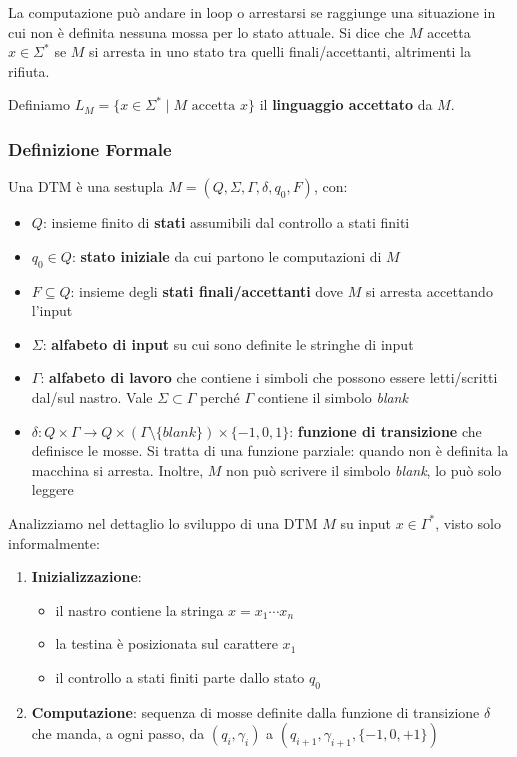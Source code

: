 La computazione può andare in loop o arrestarsi se raggiunge una situazione in cui non è definita nessuna mossa per lo stato attuale. Si dice che $M$ accetta $x \in \Sigma^\ast$ se $M$ si arresta in uno stato tra quelli finali/accettanti, altrimenti la rifiuta.

Definiamo $L_M = \{x \in \Sigma^\ast \mid M \text{ accetta } x \}$ il \textbf{linguaggio accettato} da $M$.

\subsubsection{Definizione Formale}
Una DTM è una sestupla $M = \left(Q, \Sigma, \Gamma, \delta, q_0, F\right)$, con:
\begin{itemize}
	\item $Q$: insieme finito di \textbf{stati} assumibili dal controllo a stati finiti
	\item $q_0 \in Q$: \textbf{stato iniziale} da cui partono le computazioni di $M$
	\item $F \subseteq Q$: insieme degli \textbf{stati finali/accettanti} dove $M$ si arresta accettando l'input
	\item $\Sigma$: \textbf{alfabeto di input} su cui sono definite le stringhe di input
	\item $\Gamma$: \textbf{alfabeto di lavoro} che contiene i simboli che possono essere letti/scritti dal/sul nastro. Vale $\Sigma \subset \Gamma$ perché $\Gamma$ contiene il simbolo \textit{blank}
	\item $\delta: Q \times \Gamma \rightarrow Q \times (\Gamma \setminus \{blank\}) \times \{-1, 0, 1\}$: \textbf{funzione di transizione} che definisce le mosse. Si tratta di una funzione parziale: quando non è definita la macchina si arresta. Inoltre, $M$ non può scrivere il simbolo \textit{blank}, lo può solo leggere
\end{itemize}

Analizziamo nel dettaglio lo sviluppo di una DTM $M$ su input $x \in \Gamma^\ast$, visto solo informalmente: 
\begin{enumerate}
	\item \textbf{Inizializzazione}: 
	\begin{itemize}
		\item il nastro contiene la stringa $x = x_1 \cdots x_n$
		\item la testina è posizionata sul carattere $x_1$
		\item il controllo a stati finiti parte dallo stato $q_0$
	\end{itemize}
	\item \textbf{Computazione}: sequenza di mosse definite dalla funzione di transizione $\delta$ che manda, a ogni passo, da $(q_i, \gamma_i)$ a $(q_{i+1}, \gamma_{i+1}, \{-1, 0, +1\})$
\end{enumerate}

